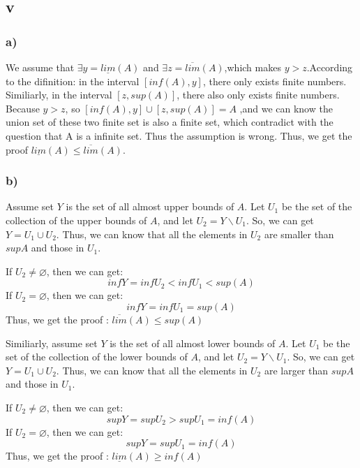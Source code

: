 \documentclass[11pt,twoside,a4paper]{article}
\begin{document}
\subsection{v}
\subsubsection{a)}
We assume that $\exists y =\underline{lim}(A) $ and $\exists z =\overline{lim}(A) $,which makes $y>z$.According to the difinition: in the interval $[inf(A),y]$, there only exists finite numbers. Similiarly, in the interval $[z,sup(A)]$, there also only exists finite numbers. Because $y>z$, so $[inf(A),y] \cup [z,sup(A)]=A$ ,and we can know the union set of these two finite set is also a finite set, which contradict with the question that A is a infinite set. Thus the assumption is wrong. Thus, we get the proof $\underline{lim}(A) \le \overline{lim}(A) $.

\subsubsection{b)}
Assume set $Y$ is the set of all almost upper bounds of $A$. Let $U{_1}$ be the set of the collection of the upper bounds of $A$, and let $U{_2}=Y \backslash  U{_1} $. So, we can get $Y =U{_1} \cup U{_2} $. Thus, we can know that all the elements in $ U{_2}$ are smaller than $supA$ and those in $ U{_1}$.\par\noindent
If $ U{_2} \neq \varnothing$, then we can get: $$inf Y=infU{_2}<infU{_1}<sup(A)$$
If $ U{_2} = \varnothing$, then we can get: $$inf Y=infU{_1}=sup(A)$$
Thus, we get the proof : $\overline{lim}(A)\le sup(A)$\par\noindent

Similiarly, assume set $Y$ is the set of all almost lower bounds of $A$. Let $U{_1}$ be the set of the collection of the lower bounds of $A$, and let $U{_2}=Y \backslash  U{_1} $. So, we can get $ Y =U{_1} \cup U{_2} $. Thus, we can know that all the elements in $ U{_2}$ are larger than $supA$ and those in $ U{_1}$.\par\noindent
If $ U{_2} \neq \varnothing$, then we can get: $$sup Y=supU{_2}>supU{_1}=inf(A)$$
If $ U{_2} = \varnothing$, then we can get: $$supY=supU{_1}=inf(A)$$
Thus, we get the proof : $\underline{lim}(A)\ge inf(A)$\par\noindent
\end{document}
